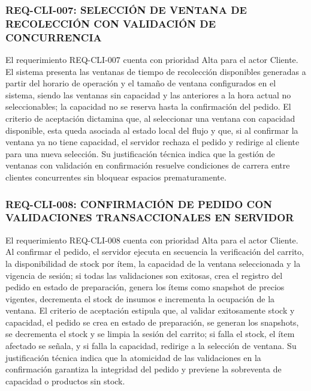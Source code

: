 \subsubsection{REQ-CLI-007: SELECCIÓN DE VENTANA DE RECOLECCIÓN CON VALIDACIÓN DE CONCURRENCIA}
El requerimiento REQ-CLI-007 cuenta con prioridad Alta para el actor Cliente. El sistema presenta las ventanas de tiempo de recolección disponibles generadas a partir del horario de operación y el tamaño de ventana configurados en el sistema, siendo las ventanas sin capacidad y las anteriores a la hora actual no seleccionables; la capacidad no se reserva hasta la confirmación del pedido. El criterio de aceptación dictamina que, al seleccionar una ventana con capacidad disponible, esta queda asociada al estado local del flujo y que, si al confirmar la ventana ya no tiene capacidad, el servidor rechaza el pedido y redirige al cliente para una nueva selección. Su justificación técnica indica que la gestión de ventanas con validación en confirmación resuelve condiciones de carrera entre clientes concurrentes sin bloquear espacios prematuramente.

\subsubsection{REQ-CLI-008: CONFIRMACIÓN DE PEDIDO CON VALIDACIONES TRANSACCIONALES EN SERVIDOR}
El requerimiento REQ-CLI-008 cuenta con prioridad Alta para el actor Cliente. Al confirmar el pedido, el servidor ejecuta en secuencia la verificación del carrito, la disponibilidad de stock por ítem, la capacidad de la ventana seleccionada y la vigencia de sesión; si todas las validaciones son exitosas, crea el registro del pedido en estado de preparación, genera los ítems como snapshot de precios vigentes, decrementa el stock de insumos e incrementa la ocupación de la ventana. El criterio de aceptación estipula que, al validar exitosamente stock y capacidad, el pedido se crea en estado de preparación, se generan los snapshots, se decrementa el stock y se limpia la sesión del carrito; si falla el stock, el ítem afectado se señala, y si falla la capacidad, redirige a la selección de ventana. Su justificación técnica indica que la atomicidad de las validaciones en la confirmación garantiza la integridad del pedido y previene la sobreventa de capacidad o productos sin stock.

